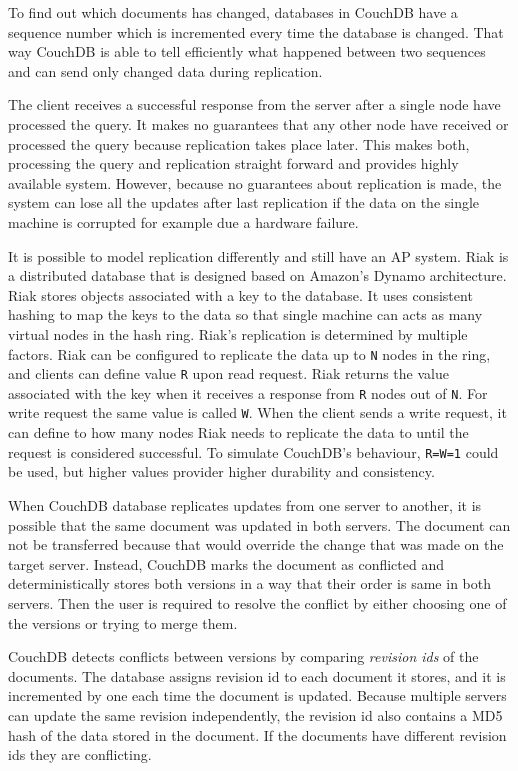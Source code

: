 To find out which documents has changed, databases in CouchDB have a sequence
number which is incremented every time the database is changed. That way CouchDB
is able to tell efficiently what happened between two sequences and can send
only changed data during replication.

The client receives a successful response from the server after a single node
have processed the query. It makes no guarantees that any other node have
received or processed the query because replication takes place later. This
makes both, processing the query and replication straight forward and provides
highly available system. However, because no guarantees about replication is
made, the system can lose all the updates after last replication if the data on
the single machine is corrupted for example due a hardware failure.

It is possible to model replication differently and still have an AP system.
Riak is a distributed database that is designed based on Amazon's Dynamo
architecture\cite{decandia2007dynamo}. Riak stores objects associated with a key
to the database. It uses consistent hashing\cite{karger1997consistent} to map
the keys to the data so that single machine can acts as many virtual nodes in
the hash ring. Riak's replication is determined by multiple factors. Riak can be
configured to replicate the data up to \texttt{N} nodes in the ring, and clients
can define value \texttt{R} upon read request. Riak returns the value associated
with the key when it receives a response from \texttt{R} nodes out of \texttt{N}.
For write request the same value is called \texttt{W}. When the client sends a
write request, it can define to how many nodes Riak needs to replicate the data
to until the request is considered successful. To simulate CouchDB's behaviour,
\texttt{R=W=1} could be used, but higher values provider higher durability and
consistency.

When CouchDB database replicates updates from one server to another, it is
possible that the same document was updated in both servers. The document can
not be transferred because that would override the change that was made on the
target server. Instead, CouchDB marks the document as conflicted and
deterministically stores both versions in a way that their order is same in both
servers. Then the user is required to resolve the conflict by either choosing
one of the versions or trying to merge them.

CouchDB detects conflicts between versions by comparing \emph{revision ids} of
the documents. The database assigns revision id to each document it stores, and
it is incremented by one each time the document is updated. Because multiple
servers can update the same revision independently, the revision id also
contains a MD5 hash of the data stored in the document. If the documents have
different revision ids they are conflicting. 

